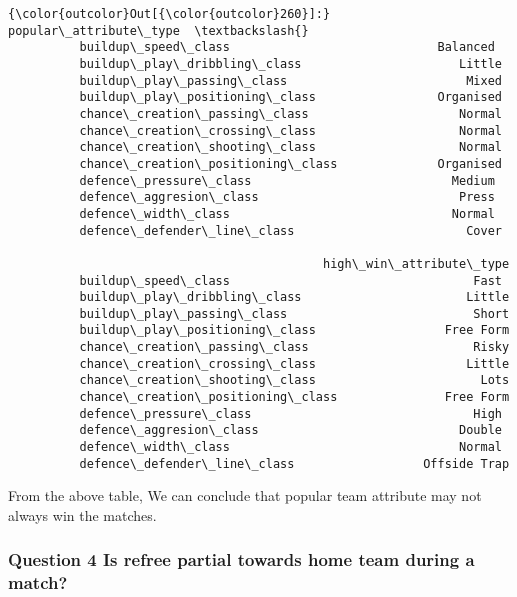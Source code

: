 \documentclass[11pt]{article}
\begin{document}
\begin{Verbatim}[commandchars=\\\{\}]
{\color{outcolor}Out[{\color{outcolor}260}]:}                                   popular\_attribute\_type  \textbackslash{}
          buildup\_speed\_class                             Balanced   
          buildup\_play\_dribbling\_class                      Little   
          buildup\_play\_passing\_class                         Mixed   
          buildup\_play\_positioning\_class                 Organised   
          chance\_creation\_passing\_class                     Normal   
          chance\_creation\_crossing\_class                    Normal   
          chance\_creation\_shooting\_class                    Normal   
          chance\_creation\_positioning\_class              Organised   
          defence\_pressure\_class                            Medium   
          defence\_aggresion\_class                            Press   
          defence\_width\_class                               Normal   
          defence\_defender\_line\_class                        Cover   
          
                                            high\_win\_attribute\_type  
          buildup\_speed\_class                                  Fast  
          buildup\_play\_dribbling\_class                       Little  
          buildup\_play\_passing\_class                          Short  
          buildup\_play\_positioning\_class                  Free Form  
          chance\_creation\_passing\_class                       Risky  
          chance\_creation\_crossing\_class                     Little  
          chance\_creation\_shooting\_class                       Lots  
          chance\_creation\_positioning\_class               Free Form  
          defence\_pressure\_class                               High  
          defence\_aggresion\_class                            Double  
          defence\_width\_class                                Normal  
          defence\_defender\_line\_class                  Offside Trap  
\end{Verbatim}
            
    From the above table, We can conclude that popular team attribute may
not always win the matches.

    \hypertarget{question-4-is-refree-partial-towards-home-team-during-a-match}{%
\subsubsection{Question 4 Is refree partial towards home team during a
match?}\label{question-4-is-refree-partial-towards-home-team-during-a-match}}
\end{document}
